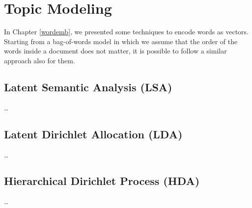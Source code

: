 \chapter{Topic Modeling}

In Chapter \ref{wordemb}, we presented some techniques to encode words as vectors.
Starting from a bag-of-words model in which we assume that the order of the words
inside a document does not matter, it is possible to follow a similar approach also for them.

\section{Latent Semantic Analysis (LSA)}
\dots

\section{Latent Dirichlet Allocation (LDA)}
\dots

\section{Hierarchical Dirichlet Process (HDA)}
\dots